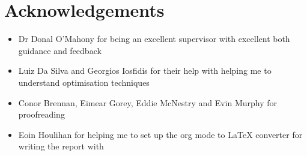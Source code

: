 \chapter*{Acknowledgements}

\begin{itemize}
  \item Dr Donal O'Mahony for being an excellent supervisor with excellent both guidance and feedback
  \item Luiz Da Silva and Georgios Iosfidis for their help with helping me to understand
optimisation techniques
  \item Conor Brennan, Eimear Gorey, Eddie McNestry and Evin Murphy for proofreading
  \item Eoin Houlihan for helping me to set up the org mode to LaTeX converter
    for writing the report with 
\end{itemize}